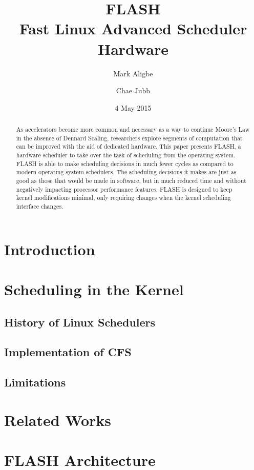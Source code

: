 \documentclass{sig-alternate-10pt}
\title{FLASH\\Fast Linux Advanced Scheduler Hardware}
\author{
	Mark Aligbe \\
	    \email{ma2799@columbia.edu}
	\and
    Chae Jubb \\
        \email{ecj2122@columbia.edu}
}
\date{4 May 2015}
\begin{document}
\maketitle

\begin{abstract}
As accelerators become more common and necessary as a way to continue Moore's Law in the absence of Dennard Scaling, researchers explore segments of computation that can be improved with the aid of dedicated hardware. This paper presents FLASH, a hardware scheduler to take over the task of scheduling from the operating system. FLASH is able to make scheduling decisions in much fewer cycles as compared to modern operating system schedulers. The scheduling decisions it makes are just as good as those that would be made in software, but in much reduced time and without negatively impacting processor performance features. FLASH is designed to keep kernel modifications minimal, only requiring changes when the kernel scheduling interface changes.

\end{abstract}


\section{Introduction}
\lipsum[1-3]


\section{Scheduling in the Kernel}
\subsection{History of Linux Schedulers}
\subsection{Implementation of CFS}
\subsection{Limitations}


\section{Related Works}
\lipsum[1-2]


\section{FLASH Architecture}
\lipsum[1-8]
\end{document}
